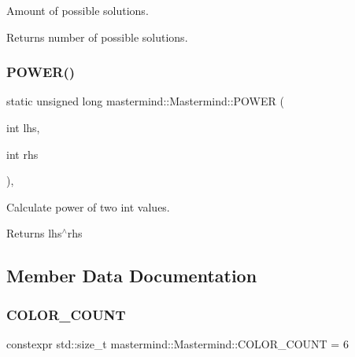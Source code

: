 Amount of possible solutions. 

\begin{DoxyReturn}{Returns}
number of possible solutions. 
\end{DoxyReturn}
\hypertarget{classmastermind_1_1_mastermind_a24e1947e0ead0b7610b14dbeea618fbd}{}\label{classmastermind_1_1_mastermind_a24e1947e0ead0b7610b14dbeea618fbd} 
\subsubsection{\texorpdfstring{P\+O\+W\+E\+R()}{POWER()}}
{\footnotesize\ttfamily static unsigned long mastermind\+::\+Mastermind\+::\+P\+O\+W\+ER (\begin{DoxyParamCaption}\item[{int}]{lhs,  }\item[{int}]{rhs }\end{DoxyParamCaption})\hspace{0.3cm}{\ttfamily [inline]}, {\ttfamily [static]}}



Calculate power of two int values. 

\begin{DoxyReturn}{Returns}
lhs$^\wedge$rhs 
\end{DoxyReturn}


\subsection{Member Data Documentation}
\hypertarget{classmastermind_1_1_mastermind_a934035f0e608928076c4ce68b50d30f0}{}\label{classmastermind_1_1_mastermind_a934035f0e608928076c4ce68b50d30f0} 
\subsubsection{\texorpdfstring{C\+O\+L\+O\+R\+\_\+\+C\+O\+U\+NT}{COLOR\_COUNT}}
{\footnotesize\ttfamily constexpr std\+::size\+\_\+t mastermind\+::\+Mastermind\+::\+C\+O\+L\+O\+R\+\_\+\+C\+O\+U\+NT = 6\hspace{0.3cm}{\ttfamily [static]}}



